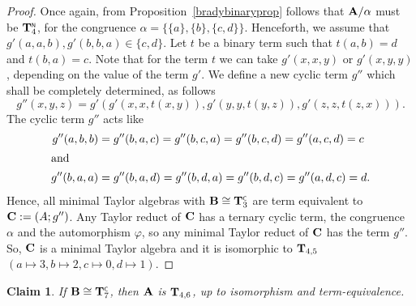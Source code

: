 \documentclass[11pt]{amsart}
\newcommand{\m}[1]{\mathbf{\uppercase{#1}}}
\newcommand{\n}{\scriptscriptstyle{\mathsf{N}}}
\newcommand{\co}{\scriptscriptstyle{\mathsf{C}}}
\theoremstyle{definition}
\theoremstyle{remark}
\theoremstyle{plain}
\newtheorem{claim}[thm]{Claim}
\begin{document}
\begin{proof}
Once again, from Proposition~\ref{bradybinaryprop} follows that ${\m A}/\alpha$ must be $\m T_4^{\n}$, for the congruence $\alpha=\{\{a\},\{b\},\{c,d\}\}$. Henceforth, we assume that $g'(a,a,b), g'(b,b,a)\in \{c,d\}$. Let $t$ be a binary term such that $t(a,b)=d$ and $t(b,a)=c$. Note that for the term $t$ we can take $g'(x,x,y)$ or $g'(x,y,y)$, depending on the value of the term $g'$. We define a new cyclic term $g''$ which shall be completely determined, as follows
$$g''(x,y,z)=g'(g'(x,x,t(x,y)),g'(y,y,t(y,z)),g'(z,z,t(z,x))).$$
The cyclic term $g''$ acts like
\begin{align*}
    g''(a,b,b)&=g''(b,a,c)=g''(b,c,a)=g''(b,c,d)=g''(a,c,d)=c\\
    \shortintertext{and}
    g''(b,a,a)&=g''(b,a,d)=g''(b,d,a)=g''(b,d,c)=g''(a,d,c)=d.
\end{align*}
Hence, all minimal Taylor algebras with ${\m B}\cong {\m T}_3^{\co}$ are term equivalent to $\m c:=(A;g'')$. Any Taylor reduct of $\m c$ has a ternary cyclic term, the congruence $\alpha$ and the automorphism $\varphi$, so any minimal Taylor reduct of $\m c$ has the term $g''$. So, $\m c$ is a minimal Taylor algebra and it is isomorphic to ${\m T}_{4,5}$ $(a\mapsto 3, b\mapsto 2, c\mapsto 0, d\mapsto 1)$.
\end{proof}


\begin{claim}
If ${\m B}\cong {\m T}_7^{\co}$, then ${\m A}$ is $ {\m T}_{4,6}$, up to isomorphism and term-equivalence.
\end{claim}
\end{document}
